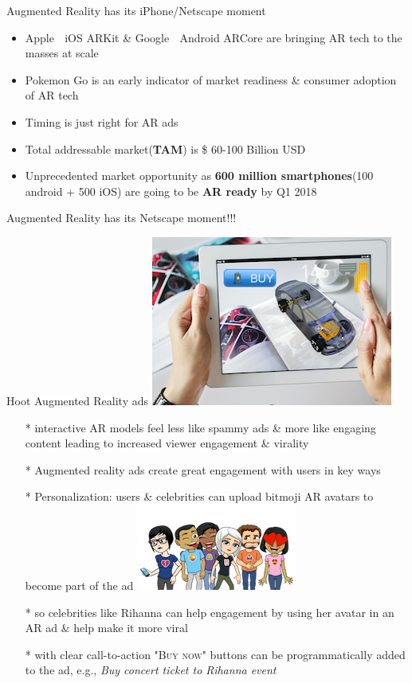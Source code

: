 \documentclass[11pt]{beamer}
\begin{document}
\begin{frame}[t]{Augmented Reality has its iPhone/Netscape moment}
 \begin{itemize}[<+-| alert@+>]
	\item Apple 🍎
	 iOS ARKit \& Google 🤖 Android ARCore are bringing AR tech to the masses at scale
	\item Pokemon Go is an early indicator of market readiness \& consumer adoption of AR tech
	\item Timing is just right for AR ads
	\item Total addressable market(\textbf{TAM}) is \$ 60-100 Billion USD 
	\item Unprecedented market opportunity as \textbf{600 million smartphones}(100 android + 500 iOS) are going to be \textbf{AR ready} by Q1 2018
\end{itemize}
\pause
\Large{Augmented Reality has its Netscape moment!!!}
\end{frame}
\begin{frame}[t]{Hoot Augmented Reality ads \includegraphics[scale=.1]{static/arad/arad5}} 
 \begin{itemize}[<+-| alert@+>]
\item[*]interactive AR models feel less like spammy ads \& more like engaging content leading to increased viewer engagement \& virality 
\item[*]Augmented reality ads create great engagement with users in key ways
\item[*]Personalization: users \& celebrities can upload bitmoji AR avatars to become part of the ad
\includegraphics[scale=.15]{static/arad/bitmoji} 
\item[*]so celebrities like Rihanna can help engagement by using her avatar in an AR ad \& help make it more viral 
\item[*]with clear call-to-action \textsc{"Buy now"} buttons can be programmatically added to the ad, e.g., \emph{ Buy concert ticket to Rihanna event}
\end{itemize}
\end{frame}
\end{document}
